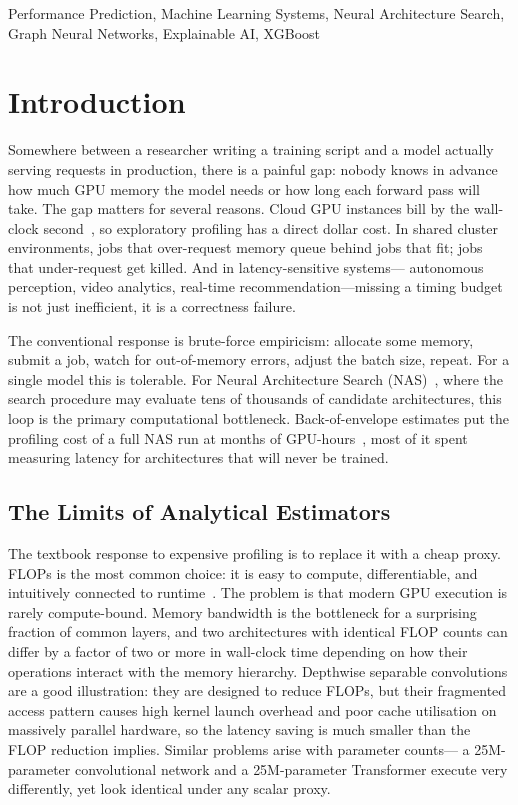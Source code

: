 \documentclass[conference]{IEEEtran}
\begin{document}
\begin{IEEEkeywords}
Performance Prediction, Machine Learning Systems, Neural Architecture Search,
Graph Neural Networks, Explainable AI, XGBoost
\end{IEEEkeywords}

\section{Introduction}

Somewhere between a researcher writing a training script and a model actually
serving requests in production, there is a painful gap: nobody knows in advance
how much GPU memory the model needs or how long each forward pass will take.
The gap matters for several reasons. Cloud GPU instances bill by the wall-clock
second~\cite{ignatov2018ai}, so exploratory profiling has a direct dollar cost.
In shared cluster environments, jobs that over-request memory queue behind jobs
that fit; jobs that under-request get killed. And in latency-sensitive systems---
autonomous perception, video analytics, real-time recommendation---missing a timing
budget is not just inefficient, it is a correctness failure.

The conventional response is brute-force empiricism: allocate some memory, submit
a job, watch for out-of-memory errors, adjust the batch size, repeat. For a single
model this is tolerable. For Neural Architecture Search (NAS)~\cite{elsken2019neural},
where the search procedure may evaluate tens of thousands of candidate architectures,
this loop is the primary computational bottleneck. Back-of-envelope estimates put
the profiling cost of a full NAS run at months of GPU-hours~\cite{li2021hw},
most of it spent measuring latency for architectures that will never be trained.

\subsection{The Limits of Analytical Estimators}

The textbook response to expensive profiling is to replace it with a cheap proxy.
FLOPs is the most common choice: it is easy to compute, differentiable, and
intuitively connected to runtime~\cite{justus2018predicting}. The problem is that
modern GPU execution is rarely compute-bound. Memory bandwidth is the bottleneck
for a surprising fraction of common layers, and two architectures with identical
FLOP counts can differ by a factor of two or more in wall-clock time depending on
how their operations interact with the memory hierarchy. Depthwise separable
convolutions are a good illustration: they are designed to reduce FLOPs, but their
fragmented access pattern causes high kernel launch overhead and poor cache
utilisation on massively parallel hardware, so the latency saving is much smaller
than the FLOP reduction implies. Similar problems arise with parameter counts---
a 25M-parameter convolutional network and a 25M-parameter Transformer execute very
differently, yet look identical under any scalar proxy.
\end{document}
